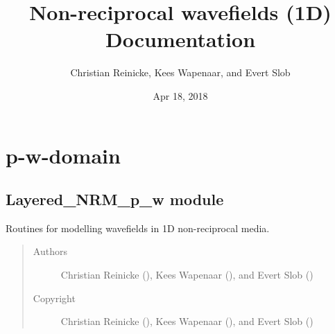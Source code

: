 \documentclass[letterpaper,10pt,english]{sphinxmanual}
\title{Non-reciprocal wavefields (1D) Documentation}
\date{Apr 18, 2018}
\author{Christian Reinicke, Kees Wapenaar, and Evert Slob}
\begin{document}
\maketitle
\sphinxtableofcontents
{}\label{\detokenize{index::doc}}



\chapter{p-w-domain}
\label{\detokenize{modules:p-w-domain}}\label{\detokenize{modules::doc}}\label{\detokenize{modules:welcome-to-non-reciprocal-wavefields-1d-s-documentation}}

\section{Layered\_NRM\_p\_w module}
\label{\detokenize{Layered_NRM_p_w::doc}}\label{\detokenize{Layered_NRM_p_w:module-Layered_NRM_p_w}}\label{\detokenize{Layered_NRM_p_w:layered-nrm-p-w-module}}
Routines for modelling wavefields in 1D non-reciprocal media.

\label{\detokenize{Layered_NRM_p_w:module-Wavefield_NRM_p_w}}\begin{quote}\begin{description}
\item[{Authors}] \leavevmode
Christian Reinicke (), Kees Wapenaar (), and Evert Slob ()

\item[{Copyright}] \leavevmode
Christian Reinicke (), Kees Wapenaar (), and Evert Slob ()

\end{description}\end{quote}
\end{document}
